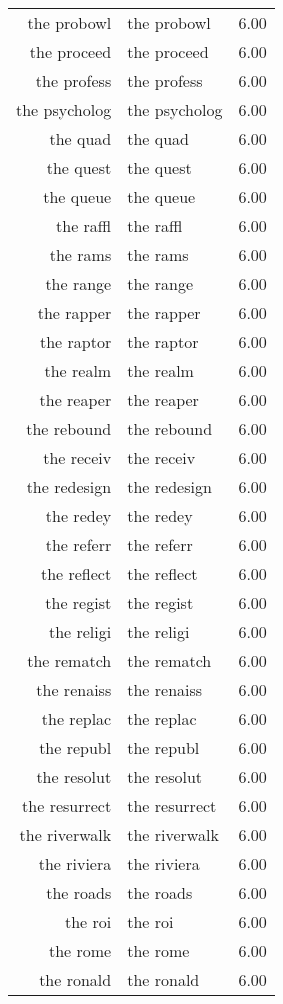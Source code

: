 \begin{table}[ht]
\begin{tabular}{rlr}
  the probowl & the probowl & 6.00 \\ 
  the proceed & the proceed & 6.00 \\ 
  the profess & the profess & 6.00 \\ 
  the psycholog & the psycholog & 6.00 \\ 
  the quad & the quad & 6.00 \\ 
  the quest & the quest & 6.00 \\ 
  the queue & the queue & 6.00 \\ 
  the raffl & the raffl & 6.00 \\ 
  the rams & the rams & 6.00 \\ 
  the range & the range & 6.00 \\ 
  the rapper & the rapper & 6.00 \\ 
  the raptor & the raptor & 6.00 \\ 
  the realm & the realm & 6.00 \\ 
  the reaper & the reaper & 6.00 \\ 
  the rebound & the rebound & 6.00 \\ 
  the receiv & the receiv & 6.00 \\ 
  the redesign & the redesign & 6.00 \\ 
  the redey & the redey & 6.00 \\ 
  the referr & the referr & 6.00 \\ 
  the reflect & the reflect & 6.00 \\ 
  the regist & the regist & 6.00 \\ 
  the religi & the religi & 6.00 \\ 
  the rematch & the rematch & 6.00 \\ 
  the renaiss & the renaiss & 6.00 \\ 
  the replac & the replac & 6.00 \\ 
  the republ & the republ & 6.00 \\ 
  the resolut & the resolut & 6.00 \\ 
  the resurrect & the resurrect & 6.00 \\ 
  the riverwalk & the riverwalk & 6.00 \\ 
  the riviera & the riviera & 6.00 \\ 
  the roads & the roads & 6.00 \\ 
  the roi & the roi & 6.00 \\ 
  the rome & the rome & 6.00 \\ 
  the ronald & the ronald & 6.00 \\ 

\end{tabular}
\end{table}
